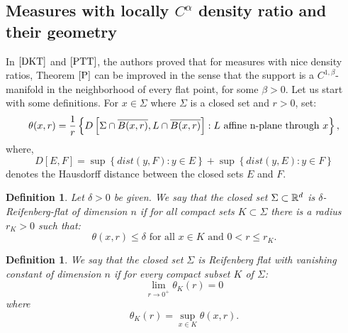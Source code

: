 \documentclass[11pt]{article}
\newtheorem{definition}[theorem]{Definition}
\theoremstyle{definition}
\theoremstyle{remark}
\numberwithin{equation}{section}
\let\inf\relax \DeclareMathOperator*\inf{\vphantom{p}inf}
\begin{document}
\subsection{Measures with locally $C^{\alpha}$ density ratio and their geometry}
In $\cite{DKT}$ and $\cite{PTT}$, the authors proved that for measures with nice density ratios, Theorem $\cite{P}$ can be improved in the sense that the support is a $C^{1,\beta}$-manifold in the neighborhood of every flat point, for some $\beta >0$.
Let us start with some definitions.
For $x \in \Sigma$  where $\Sigma$ is a closed set and $r>0$, set: 
\begin{equation}
\theta(x,r)= \frac{1}{r} \inf \left\lbrace D\left[\Sigma \cap \overline{B(x,r)},L\cap \overline{B(x,r)} \right] : L \text{ affine n-plane through }x \right\rbrace ,
\end{equation}
 where,
 \begin{equation} 
 D[E,F]=\sup\left\lbrace dist(y,F) : y \in E\right\rbrace + \sup \left\lbrace dist(y,E) : y \in F \right\rbrace
 \end{equation}
 denotes the Hausdorff distance between the closed sets $E$ and $F$.
 

\begin{definition}
Let $\delta >0$ be given. We say that the closed set $\Sigma \subset \mathbb{R}^{d}$ is $\delta$-Reifenberg-flat of dimension $n$ if for all compact sets $K \subset \Sigma$ there is a radius $r_K >0$ such that:
\begin{equation}
\theta(x,r) \leq \delta \text{ for all } x \in K \text{ and } 0<r \leq r_{K}.
\end{equation}

\end{definition}
\begin{definition}
We say that the closed set $\Sigma$ is Reifenberg flat with vanishing constant of dimension $n$ if for every compact subset $K$ of $\Sigma$: 
\begin{equation}
\lim_{r \to 0^{+}} \theta_{K}(r)=0 
\end{equation}
where 
\begin{equation}
\theta_{K}(r)=\sup_{x \in K} \theta(x,r) .
\end{equation}
\end{definition}
\end{document}
